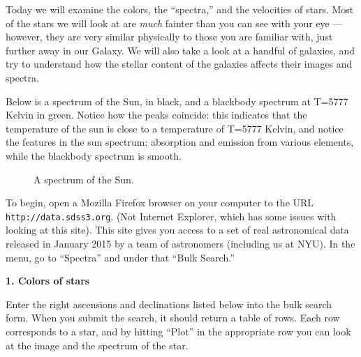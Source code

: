 
\noindent Today we will examine the colors, the ``spectra,'' and the
velocities of stars. Most of the stars we will look at are {\it much}
fainter than you can see with your eye --- however, they are very
similar physically to those you are familiar with, just further away
in our Galaxy. We will also take a look at a handful of galaxies, and
try to understand how the stellar content of the galaxies affects
their images and spectra.

\noindent Below is a spectrum of the Sun, in black, and a blackbody
spectrum at T=5777 Kelvin in green. Notice how the peaks coincide:
this indicates that the temperature of the sun is close to a
temperature of T=5777 Kelvin, and notice the features in the sun
spectrum: absorption and emission from various elements, while the
blackbody spectrum is smooth.

\begin{figure*}[h!]
\begin{center}{} \caption{A
spectrum of the Sun.}
\end{center}
\end{figure*}

\noindent To begin, open a Mozilla Firefox browser on your computer to
the URL {\tt http://data.sdss3.org}. (Not Internet Explorer, which has
some issues with looking at this site). This site gives you access to
a set of real astronomical data released in January 2015 by a team of
astronomers (including us at NYU).  In the menu, go to ``Spectra'' and
under that ``Bulk Search.''

\noindent
{\bf 1. Colors of stars}

\noindent Enter the right ascensions and declinations listed below
into the bulk search form. When you submit the search, it should
return a table of rows.  Each row corresponds to a star, and by
hitting ``Plot'' in the appropriate row you can look at the image and
the spectrum of the star.

